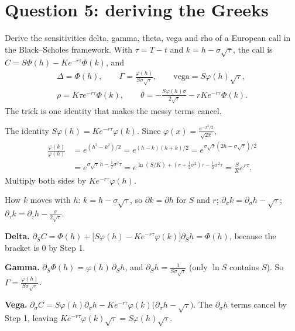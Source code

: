 \section{Question 5: deriving the Greeks}

\begin{problem}[Q5]
Derive the sensitivities delta, gamma, theta, vega and rho of a European call in the Black--Scholes framework.
\cardsays With $\tau=T-t$ and $k=h-\sigma\sqrt\tau$, the call is $C=S\Phi(h)-Ke^{-r\tau}\Phi(k)$, and
\[
\begin{gathered}
\Delta=\Phi(h),\qquad\Gamma=\frac{\varphi(h)}{S\sigma\sqrt\tau},\qquad\text{vega}=S\varphi(h)\sqrt\tau,\\
\rho=K\tau e^{-r\tau}\Phi(k),\qquad\theta=-\frac{S\varphi(h)\sigma}{2\sqrt\tau}-rKe^{-r\tau}\Phi(k).
\end{gathered}
\]
The trick is one identity that makes the messy terms cancel.
\working
\begin{steps}
\item The identity $S\varphi(h)=Ke^{-r\tau}\varphi(k)$. Since $\varphi(x)=\frac{e^{-x^2/2}}{\sqrt{2\pi}}$,
\[
\begin{aligned}
\frac{\varphi(k)}{\varphi(h)}&=e^{(h^2-k^2)/2}=e^{(h-k)(h+k)/2}=e^{\sigma\sqrt\tau(2h-\sigma\sqrt\tau)/2}\\
&=e^{\sigma\sqrt\tau\,h-\frac12\sigma^2\tau}=e^{\ln(S/K)+(r+\frac12\sigma^2)\tau-\frac12\sigma^2\tau}=\frac SKe^{r\tau}.
\end{aligned}
\]
Multiply both sides by $Ke^{-r\tau}\varphi(h)$.
\item How $k$ moves with $h$: $k=h-\sigma\sqrt\tau$, so $\partial k=\partial h$ for $S$ and $r$; $\partial_\sigma k=\partial_\sigma h-\sqrt\tau$; $\partial_\tau k=\partial_\tau h-\frac{\sigma}{2\sqrt\tau}$.
\item \textbf{Delta.} $\partial_SC=\Phi(h)+\big[S\varphi(h)-Ke^{-r\tau}\varphi(k)\big]\partial_Sh=\Phi(h)$, because the bracket is $0$ by Step 1.
\item \textbf{Gamma.} $\partial_S\Phi(h)=\varphi(h)\,\partial_Sh$, and $\partial_Sh=\frac{1}{S\sigma\sqrt\tau}$ (only $\ln S$ contains $S$). So $\Gamma=\frac{\varphi(h)}{S\sigma\sqrt\tau}$.
\item \textbf{Vega.} $\partial_\sigma C=S\varphi(h)\partial_\sigma h-Ke^{-r\tau}\varphi(k)\big(\partial_\sigma h-\sqrt\tau\big)$. The $\partial_\sigma h$ terms cancel by Step 1, leaving $Ke^{-r\tau}\varphi(k)\sqrt\tau=S\varphi(h)\sqrt\tau$.

\end{steps}
\end{problem}

